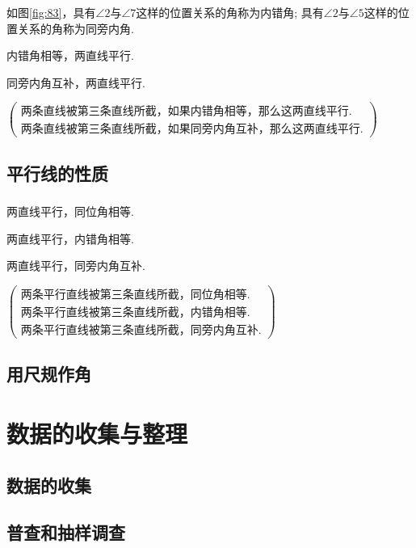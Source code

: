 \documentclass[fontset=windows]{ctexrep}
\begin{document}
\subsection{}
\par 如图\ref{fig:83}，具有$\angle 2$与$\angle 7$这样的位置关系的角称为{\heiti 内错角}; 具有$\angle 2$与$\angle 5$这样的位置关系的角称为{\heiti 同旁内角}.
\par {\heiti 内错角相等，两直线平行.\par 同旁内角互补，两直线平行.}
\par
$\begin{pmatrix}
        两条直线被第三条直线所截，如果内错角相等，那么这两直线平行. \\两条直线被第三条直线所截，如果同旁内角互补，那么这两直线平行.
    \end{pmatrix}$
\section{平行线的性质}
\subsection{}
\par {\heiti 两直线平行，同位角相等.\par 两直线平行，内错角相等.\par 两直线平行，同旁内角互补.}
\par
$\begin{pmatrix}
        两条平行直线被第三条直线所截，同位角相等. \\
        两条平行直线被第三条直线所截，内错角相等. \\
        两条平行直线被第三条直线所截，同旁内角互补.
    \end{pmatrix}$
\subsection{}
\section{用尺规作角}
\chapter{数据的收集与整理}
\section{数据的收集}
\section{普查和抽样调查}
\end{document}
